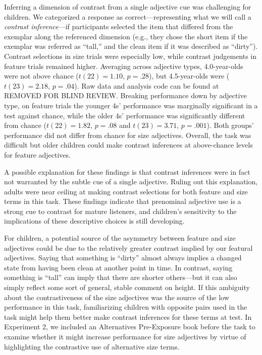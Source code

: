 \documentclass[man]{apa2}
\begin{document}
Inferring a dimension of contrast from a single adjective cue was challenging for children. We categorized a response as correct---representing what we will call a \emph{contrast inference}---if participants selected the item that differed from the exemplar along the referenced dimension (e.g., they chose the short item if the exemplar was referred as ``tall,'' and the clean item if it was described as ``dirty'').  Contrast selections in size trials were especially low, while contrast judgements in feature trials remained higher. Averaging across adjective types, 4.0-year-olds were not above chance ($t(22) = 1.10$, $p = .28$), but 4.5-year-olds were ($t(23)=2.18$, $p = .04$). Raw data and analysis code can be found at REMOVED FOR BLIND REVIEW. Breaking performance down by adjective type, on feature trials the younger 4s' performance was marginally significant in a test against chance, while the older 4s' performance was significantly different from chance ($t(22) = 1.82$, $p = .08$ and $t(23)=3.71$, $p = .001$). Both groups' performance did not differ from chance for size adjectives. Overall, the task was difficult but older children could make contrast inferences at above-chance levels for feature adjectives. 

A possible explanation for these findings is that contrast inferences were in fact not warranted by the subtle cue of a single adjective. Ruling out this explanation, adults were near ceiling at making contrast selections for both feature and size terms in this task. These findings indicate that prenominal adjective use is a strong cue to contrast for mature listeners, and children's sensitivity to the implications of these descriptive choices is still developing.

For children, a potential source of the asymmetry between feature and size adjectives could be due to the relatively greater contrast implied by our featural adjectives. Saying that something is ``dirty'' almost always implies a changed state from having been clean at another point in time. In contrast, saying something is ``tall'' can imply that there are shorter others---but it can also simply reflect some sort of general, stable comment on height. If this ambiguity about the contrastiveness of the size adjectives was the source of the low performance in this task, familiarizing children with opposite pairs used in the task might help them better make contrast inferences for these terms at test. In Experiment 2, we included an Alternatives Pre-Exposure book before the task to examine whether it might increase performance for size adjectives by virtue of highlighting the contrastive use of alternative size terms. 
\end{document}
